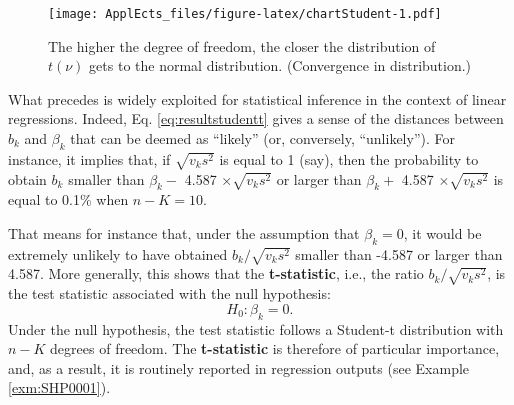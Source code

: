 \documentclass[
  12pt,
]{book}
\theoremstyle{definition}
\theoremstyle{definition}
\theoremstyle{definition}
\theoremstyle{definition}
\theoremstyle{remark}
\begin{document}
\begin{figure}
\centering
\texttt{[image: ApplEcts\_files/figure-latex/chartStudent-1.pdf]}
\caption{\label{fig:chartStudent}The higher the degree of freedom, the closer the distribution of \(t(\nu)\) gets to the normal distribution. (Convergence in distribution.)}
\end{figure}

What precedes is widely exploited for statistical inference in the context of linear regressions. Indeed, Eq. \eqref{eq:resultstudentt} gives a sense of the distances between \(b_k\) and \(\beta_k\) that can be deemed as ``likely'' (or, conversely, ``unlikely''). For instance, it implies that, if \(\sqrt{v_k s^2}\) is equal to 1 (say), then the probability to obtain \(b_k\) smaller than \(\beta_k-\) 4.587 \(\times \sqrt{v_k s^2}\) or larger than \(\beta_k+\) 4.587 \(\times \sqrt{v_k s^2}\) is equal to 0.1\% when \(n-K=10\).

That means for instance that, under the assumption that \(\beta_k=0\), it would be extremely unlikely to have obtained \(b_k/\sqrt{v_k s^2}\) smaller than -4.587 or larger than 4.587. More generally, this shows that the \textbf{t-statistic}, i.e., the ratio \(b_k/\sqrt{v_k s^2}\), is the test statistic associated with the null hypothesis:
\[
H_0: \beta_k=0.
\]
Under the null hypothesis, the test statistic follows a Student-t distribution with \(n-K\) degrees of freedom. The \textbf{t-statistic} is therefore of particular importance, and, as a result, it is routinely reported in regression outputs (see Example \ref{exm:SHP0001}).
\end{document}
